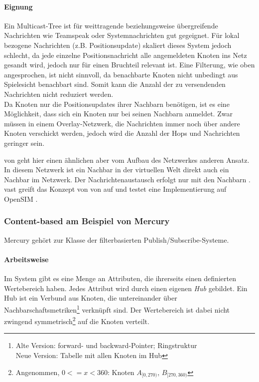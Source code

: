 \paragraph*{Eignung}
Ein Multicast-Tree ist für weittragende beziehungsweise übergreifende Nachrichten wie Teamspeak oder Systemnachrichten gut gegeignet. Für lokal bezogene Nachrichten (z.B. Positionsupdate) skaliert dieses System jedoch schlecht, da jede einzelne Positionsnachricht alle angemeldeten Knoten ins Netz gesandt wird, jedoch nur für einen Bruchteil relevant ist. Eine Filterung, wie oben angesprochen, ist nicht sinnvoll, da benachbarte Knoten nicht unbedingt aus Spielesicht benachbart sind. Somit kann die Anzahl der zu versendenden Nachrichten nicht reduziert werden.\\
Da Knoten nur die Positionsupdates ihrer Nachbarn benötigen, ist es eine Möglichkeit, dass sich ein Knoten nur bei seinen Nachbarn anmeldet. Zwar müssen in einem Overlay-Netzwerk, die Nachrichten immer noch über andere Knoten verschickt werden, jedoch wird die Anzahl der Hops und Nachrichten geringer sein.

\ac{von} geht hier einen ähnlichen aber vom Aufbau des Netzwerkes anderen Ansatz. In diesem Netzwerk ist ein Nachbar in der virtuellen Welt direkt auch ein Nachbar im Netzwerk. Der Nachrichtenaustausch erfolgt nur mit den Nachbarn \cite{Hu2006VON}. \ac{vast} \cite{Backhaus2007Voronoibased} greift das Konzept von \ac{von} auf und testet eine Implementierung auf OpenSIM \cite{Baumgart2007OverSim}.



\subsubsection{Content-based am Beispiel von Mercury}
\label{chap:related:mercury}
Mercury \cite{Bharambe2004Mercury} gehört zur Klasse der filterbasierten Publish/Subscribe-Systeme.

\paragraph*{Arbeitsweise}
Im System gibt es eine Menge an Attributen, die ihrerseits einen definierten Wertebereich haben. Jedes Attribut wird durch einen eigenen \emph{Hub} gebildet. Ein Hub ist ein Verbund aus Knoten, die untereinander über Nachbarschaftsmetriken\footnote{Alte Version: forward- und backward-Pointer; Ringstruktur\\Neue Version: Tabelle mit allen Knoten im Hub} verknüpft sind. Der Wertebereich ist dabei nicht zwingend symmetrisch\footnote{Angenommen, $0<=x<360$: Knoten $A_{[0,270)}$, $B_{[270, 360)}$} auf die Knoten verteilt.

